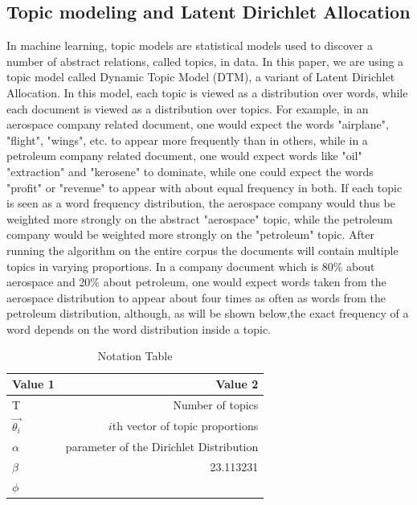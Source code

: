 \documentclass[12pt,journal,letterpaper,oneside,onecolumn]{IEEEtran}
\begin{document}
\subsection{Topic modeling and Latent Dirichlet Allocation}
In machine learning, topic models are statistical models used to discover a number of abstract relations, called topics, in data. In this paper, we are using a topic model called Dynamic Topic Model (DTM), a variant of Latent Dirichlet Allocation.
In this model, each topic is viewed as a distribution over words, while each document is viewed as a distribution over topics.
For example, in an aerospace company related document, one would expect the words "airplane", "flight", "wings", etc. to appear more frequently than in others, while in a petroleum company related document, one would expect words like "oil" "extraction" and "kerosene" to dominate, while one could expect the words "profit" or "revenue" to appear with about equal frequency in both.
If each topic is seen as a word frequency distribution, the aerospace company would thus be weighted more strongly on the abstract "aerospace" topic, while the petroleum company would be weighted more strongly on the "petroleum" topic.
After running the algorithm on the entire corpus the documents will contain multiple topics in varying proportions. In a company document which is 80\% about aerospace and 20\% about petroleum, one would expect words taken from the aerospace distribution to appear about four times as often as words from the petroleum distribution, although, as will be shown below,the exact frequency of a word depends on the word distribution inside a topic.

\begin{table}[h!]
  \begin{center}
    \caption{Notation Table}
    \begin{tabular}{l|r} %
      \textbf{Value 1} & \textbf{Value 2}\\
      \hline
      T & Number of topics\\
      $\vec{\theta_i}$ \ & $i$th vector of topic proportions\\
      $\alpha$ & parameter of the Dirichlet Distribution \\
      $\beta$ & 23.113231\\
      $\phi$ & \\
    \end{tabular}
  \end{center}
\end{table}
\end{document}
